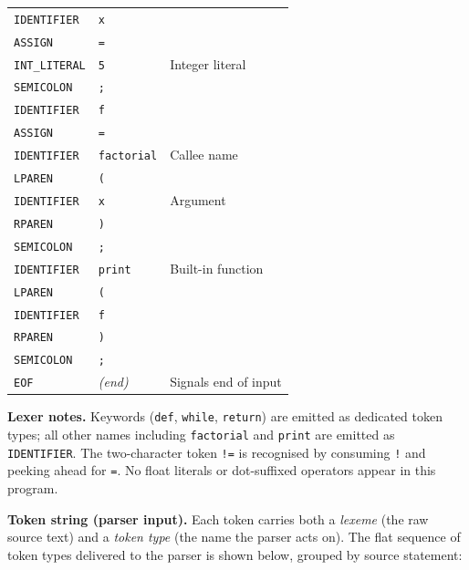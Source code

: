 \documentclass[11pt,a4paper]{article}
\begin{document}
\begin{longtable}{@{}lll@{}}
  \rowcolor{rowgray}
  \texttt{IDENTIFIER} & \texttt{x}         & \\
  \texttt{ASSIGN}     & \texttt{=}         & \\
  \rowcolor{rowgray}
  \texttt{INT\_LITERAL} & \texttt{5}         & Integer literal \\
  \texttt{SEMICOLON}  & \texttt{;}         & \\
  \rowcolor{rowgray}
  \texttt{IDENTIFIER} & \texttt{f}         & \\
  \texttt{ASSIGN}     & \texttt{=}         & \\
  \rowcolor{rowgray}
  \texttt{IDENTIFIER} & \texttt{factorial} & Callee name \\
  \texttt{LPAREN}     & \texttt{(}         & \\
  \rowcolor{rowgray}
  \texttt{IDENTIFIER} & \texttt{x}         & Argument \\
  \texttt{RPAREN}     & \texttt{)}         & \\
  \rowcolor{rowgray}
  \texttt{SEMICOLON}  & \texttt{;}         & \\
  \texttt{IDENTIFIER} & \texttt{print}     & Built-in function \\
  \rowcolor{rowgray}
  \texttt{LPAREN}     & \texttt{(}         & \\
  \texttt{IDENTIFIER} & \texttt{f}         & \\
  \rowcolor{rowgray}
  \texttt{RPAREN}     & \texttt{)}         & \\
  \texttt{SEMICOLON}  & \texttt{;}         & \\
  \rowcolor{rowgray}
  \texttt{EOF}        & \textit{(end)}     & Signals end of input \\
\end{longtable}

\noindent\textbf{Lexer notes.}
Keywords (\texttt{def}, \texttt{while}, \texttt{return}) are emitted as
dedicated token types; all other names including \texttt{factorial} and
\texttt{print} are emitted as \texttt{IDENTIFIER}.  The two-character token
\texttt{!=} is recognised by consuming \texttt{!} and peeking ahead for
\texttt{=}.  No float literals or dot-suffixed operators appear in this program.

\noindent\textbf{Token string (parser input).}
Each token carries both a \emph{lexeme} (the raw source text) and a
\emph{token type} (the name the parser acts on).
The flat sequence of token types delivered to the parser is shown below,
grouped by source statement:
\end{document}
